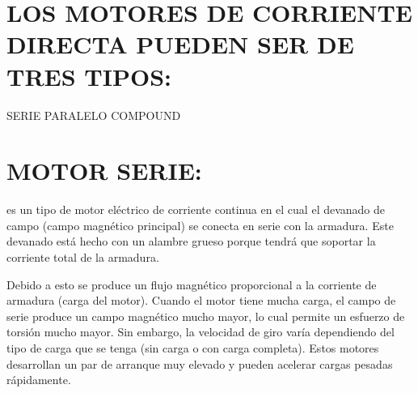\documentclass[10pt,letterpaper]{article}
\begin{document}
\section{LOS MOTORES DE CORRIENTE DIRECTA PUEDEN SER DE TRES TIPOS:}
SERIE
\linebreak
PARALELO
\linebreak
COMPOUND
\linebreak
\section{MOTOR SERIE:}
 es un tipo de motor eléctrico de corriente continua en el cual el devanado de campo (campo magnético principal) se conecta en serie con la armadura. Este devanado está hecho con un alambre grueso porque tendrá que soportar la corriente total de la armadura.

Debido a esto se produce un flujo magnético proporcional a la corriente de armadura (carga del motor). Cuando el motor tiene mucha carga, el campo de serie produce un campo magnético mucho mayor, lo cual permite un esfuerzo de torsión mucho mayor. Sin embargo, la velocidad de giro varía dependiendo del tipo de carga que se tenga (sin carga o con carga completa). Estos motores desarrollan un par de arranque muy elevado y pueden acelerar cargas pesadas rápidamente.
\end{document}
